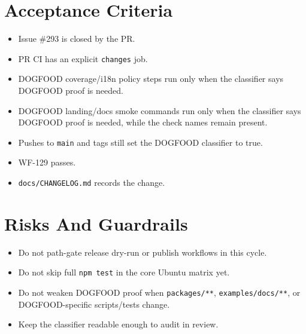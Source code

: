 \section{Acceptance Criteria}\label{record-211-acceptance-criteria}

\begin{itemize}
\tightlist
\item
  Issue \#293 is closed by the PR.
\item
  PR CI has an explicit \texttt{c\allowbreak{}h\allowbreak{}a\allowbreak{}n\allowbreak{}g\allowbreak{}e\allowbreak{}s} job.
\item
  DOGFOOD coverage/i18n policy steps run only when the classifier says DOGFOOD proof is needed.
\item
  DOGFOOD landing/docs smoke commands run only when the classifier says DOGFOOD proof is needed, while the check names remain present.
\item
  Pushes to \texttt{m\allowbreak{}a\allowbreak{}i\allowbreak{}n} and tags still set the DOGFOOD classifier to true.
\item
  WF-129 passes.
\item
  \texttt{d\allowbreak{}o\allowbreak{}c\allowbreak{}s\allowbreak{}/\allowbreak{}C\allowbreak{}H\allowbreak{}A\allowbreak{}N\allowbreak{}G\allowbreak{}E\allowbreak{}L\allowbreak{}O\allowbreak{}G\allowbreak{}.\allowbreak{}m\allowbreak{}d} records the change.
\end{itemize}

\section{Risks And Guardrails}\label{record-211-risks-and-guardrails}

\begin{itemize}
\tightlist
\item
  Do not path-gate release dry-run or publish workflows in this cycle.
\item
  Do not skip full \texttt{n\allowbreak{}p\allowbreak{}m\allowbreak{} \allowbreak{}t\allowbreak{}e\allowbreak{}s\allowbreak{}t} in the core Ubuntu matrix yet.
\item
  Do not weaken DOGFOOD proof when \texttt{p\allowbreak{}a\allowbreak{}c\allowbreak{}k\allowbreak{}a\allowbreak{}g\allowbreak{}e\allowbreak{}s\allowbreak{}/\allowbreak{}*\allowbreak{}*}, \texttt{e\allowbreak{}x\allowbreak{}a\allowbreak{}m\allowbreak{}p\allowbreak{}l\allowbreak{}e\allowbreak{}s\allowbreak{}/\allowbreak{}d\allowbreak{}o\allowbreak{}c\allowbreak{}s\allowbreak{}/\allowbreak{}*\allowbreak{}*}, or DOGFOOD-specific scripts/tests change.
\item
  Keep the classifier readable enough to audit in review.
\end{itemize}

